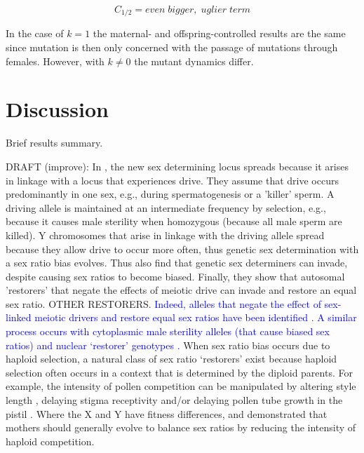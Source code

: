 \documentclass[12pt]{article}
\begin{document}
\begin{equation}
C_{1/2} = even \; bigger, \; uglier \; term
\end{equation}

In the case of $k=1$ the maternal- and offspring-controlled results are the same since mutation is then only concerned with the passage of mutations through females.
However, with $k\neq0$ the mutant dynamics differ.	

\linenumbers
\modulolinenumbers[2]

\section*{Discussion}

Brief results summary. 

DRAFT (improve): In \citet{Ubeda:2015fx}, the new sex determining locus spreads because it arises in linkage with a locus that experiences drive. They assume that drive occurs predominantly in one sex, e.g., during spermatogenesis or a 'killer' sperm. A driving allele is maintained at an intermediate frequency by selection, e.g., because it causes male sterility when homozygous (because all male sperm are killed). Y chromosomes that arise in linkage with the driving allele spread because they allow drive to occur more often, thus genetic sex determination with a sex ratio bias evolves. 
Thus \citet{Ubeda:2015fx} also find that genetic sex determiners can invade, despite causing sex ratios to become biased. 
Finally, they show that autosomal 'restorers' that negate the effects of meiotic drive can invade and restore an equal sex ratio. 
OTHER RESTORERS.
\textcolor{blue}{Indeed, alleles that negate the effect of sex-linked meiotic drivers and restore equal sex ratios have been identified \citep{Stalker:1961th,Smith:1975ft}. 
A similar process occurs with cytoplasmic male sterility alleles (that cause biased sex ratios) and nuclear `restorer' genotypes \citep{Frank:1989vl}. 
}
When sex ratio bias occurs due to haploid selection, a natural class of sex ratio `restorers' exist because haploid selection often occurs in a context that is determined by the diploid parents. 
For example, the intensity of pollen competition can be manipulated by altering style length \citep{Travers:2001,Lankinen:2001gc,Ruane:2009vt}, delaying stigma receptivity \citep{Galen:1986wq,Lankinen:2011if} and/or delaying pollen tube growth in the pistil \citep{Herrero:2003jf}. 
Where the X and Y have fitness differences, \citet{Hough:2013uo} and \citet{Otto:2015va} demonstrated that mothers should generally evolve to balance sex ratios by reducing the intensity of haploid competition. 
\end{document}
